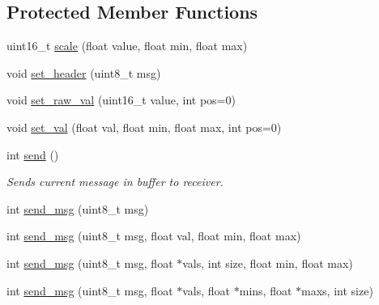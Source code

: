 \subsection*{Protected Member Functions}
\begin{DoxyCompactItemize}
\item 
uint16\+\_\+t \hyperlink{classSender_a3f9b3e01bba5182c99bcdcd255b2b54d}{scale} (float value, float min, float max)
\item 
void \hyperlink{classSender_ae9d3dc0d2d5437301c95a9b2705e237c}{set\+\_\+header} (uint8\+\_\+t msg)
\item 
void \hyperlink{classSender_afe046ebb888182a423ce0b4b4202d6ec}{set\+\_\+raw\+\_\+val} (uint16\+\_\+t value, int pos=0)
\item 
void \hyperlink{classSender_af290dc1fdd12fc1b1c1bec91f7dc0311}{set\+\_\+val} (float val, float min, float max, int pos=0)
\item 
int \hyperlink{classSender_a65ab243a47547575be6faccd9fb21127}{send} ()\hypertarget{classSender_a65ab243a47547575be6faccd9fb21127}{}\label{classSender_a65ab243a47547575be6faccd9fb21127}

\begin{DoxyCompactList}\small\item\em Sends current message in buffer to receiver. \end{DoxyCompactList}\item 
int \hyperlink{classSender_a02926397fba30138bf766d7a967d1318}{send\+\_\+msg} (uint8\+\_\+t msg)
\item 
int \hyperlink{classSender_aaad3560b43b3baf02e133ab3966711ab}{send\+\_\+msg} (uint8\+\_\+t msg, float val, float min, float max)
\item 
int \hyperlink{classSender_ab09ef77aed052f2dc2736655ee6b5598}{send\+\_\+msg} (uint8\+\_\+t msg, float $\ast$vals, int size, float min, float max)
\item 
int \hyperlink{classSender_abad229fe0df639fd1ccb38714d9c77ec}{send\+\_\+msg} (uint8\+\_\+t msg, float $\ast$vals, float $\ast$mins, float $\ast$maxs, int size)
\end{DoxyCompactItemize}
